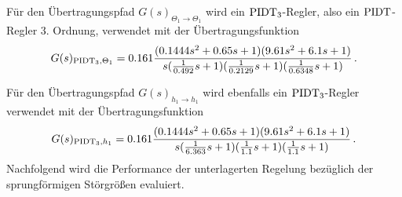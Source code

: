 Für den Übertragungspfad $G(s)_{\Theta_1 \rightarrow \Theta_1}$ wird ein $\textnormal{PIDT}_3$-Regler, also ein $\textnormal{PIDT}$-Regler 3. Ordnung, verwendet mit der Übertragungsfunktion 
\begin{align*}
G(s)_{\textnormal{PIDT}_3,\Theta_1} = 0.161\frac{(0.1444s^2+0.65s+1)(9.61s^2+6.1s+1)}{s(\frac{1}{0.492}s+1)(\frac{1}{0.2129}s+1)(\frac{1}{0.6348}s+1)} \, .
\end{align*}

Für den Übertragungspfad $G(s)_{h_1 \rightarrow h_1}$ wird ebenfalls ein $\textnormal{PIDT}_3$-Regler verwendet mit der Übertragungsfunktion 
\begin{align*}
G(s)_{\textnormal{PIDT}_3,h_1} = 0.161\frac{(0.1444s^2+0.65s+1)(9.61s^2+6.1s+1)}{s(\frac{1}{6.363}s+1)(\frac{1}{1.1}s+1)(\frac{1}{1.1}s+1)} \, .
\end{align*}
Nachfolgend wird die Performance der unterlagerten Regelung bezüglich der sprungförmigen Störgrößen evaluiert.

